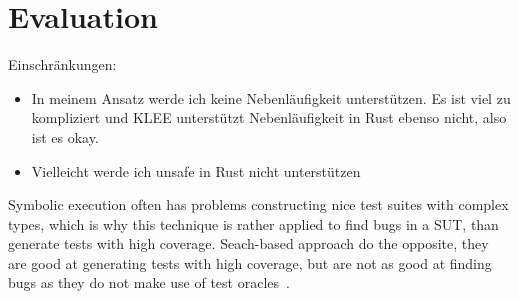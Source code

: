 \documentclass{article}
\begin{document}
\section{Evaluation}
Einschränkungen:
\begin{itemize}
    \item In meinem Ansatz werde ich keine Nebenläufigkeit unterstützen. Es ist viel zu kompliziert und KLEE unterstützt Nebenläufigkeit in Rust ebenso nicht, also ist es okay. 
    \item Vielleicht werde ich unsafe in Rust nicht unterstützen
\end{itemize}

Symbolic execution often has problems constructing nice test suites with complex types, which is why this technique is rather applied to find bugs in a \ac{SUT}, than generate tests with high coverage. Seach-based approach do the opposite, they are good at generating tests with high coverage, but are not as good at finding bugs as they do not make use of test oracles~\cite{Fraser2013}.


\appendix




\end{document}
